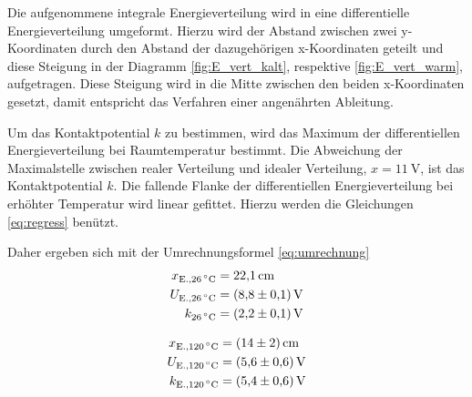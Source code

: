 Die aufgenommene integrale Energieverteilung wird in eine differentielle Energieverteilung umgeformt.
Hierzu wird der Abstand zwischen zwei y-Koordinaten durch den Abstand der dazugehörigen x-Koordinaten geteilt und diese Steigung in der Diagramm \ref{fig:E_vert_kalt}, respektive \ref{fig:E_vert_warm}, aufgetragen. 
Diese Steigung wird in die Mitte zwischen den beiden x-Koordinaten gesetzt, damit entspricht das Verfahren einer angenährten Ableitung.

Um das Kontaktpotential $k$ zu bestimmen, wird das Maximum der differentiellen Energieverteilung bei Raumtemperatur bestimmt.
Die Abweichung der Maximalstelle zwischen realer Verteilung und idealer Verteilung, $x=\SI{11}{\volt}$, ist das Kontaktpotential $k$.
Die fallende Flanke der differentiellen Energieverteilung bei erhöhter Temperatur wird linear gefittet.
Hierzu werden die Gleichungen \ref{eq:regress} benützt.

Daher ergeben sich mit der Umrechnungsformel \eqref{eq:umrechnung}
\begin{align}
	x_\text{E.,\SI{26}{\degreeCelsius}}&= \SI{22.1}{\centi\meter}\\
	U_\text{E.,\SI{26}{\degreeCelsius}}&= \SI{8.8(1)}{\volt}\\
	k_\text{\SI{26}{\degreeCelsius}} &= \SI{2.2(1)}{\volt}
\end{align}

\begin{align}
	x_\text{E.,\SI{120}{\degreeCelsius}}&= \SI{14(2)}{\centi\meter}\\
	U_\text{E.,\SI{120}{\degreeCelsius}}&= \SI{5.6(6)}{\volt}\\
	k_\text{E.,\SI{120}{\degreeCelsius}}&= \SI{5.4(6)}{\volt}
\end{align}

